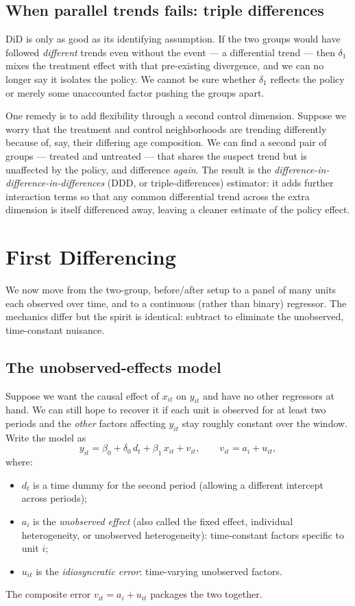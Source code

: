 \subsection{When parallel trends fails: triple differences}

DiD is only as good as its identifying assumption. If the two groups would have followed \emph{different} trends even without the event --- a differential trend --- then $\delta_1$ mixes the treatment effect with that pre-existing divergence, and we can no longer say it isolates the policy. We cannot be sure whether $\delta_1$ reflects the policy or merely some unaccounted factor pushing the groups apart.

One remedy is to add flexibility through a second control dimension. Suppose we worry that the treatment and control neighborhoods are trending differently because of, say, their differing age composition. We can find a second pair of groups --- treated and untreated --- that shares the suspect trend but is unaffected by the policy, and difference \emph{again}. The result is the \emph{difference-in-difference-in-differences} (DDD, or triple-differences) estimator: it adds further interaction terms so that any common differential trend across the extra dimension is itself differenced away, leaving a cleaner estimate of the policy effect.

\section{First Differencing}
\label{sec:fd}

We now move from the two-group, before/after setup to a panel of many units each observed over time, and to a continuous (rather than binary) regressor. The mechanics differ but the spirit is identical: subtract to eliminate the unobserved, time-constant nuisance.

\subsection{The unobserved-effects model}

Suppose we want the causal effect of $x_{it}$ on $y_{it}$ and have no other regressors at hand. We can still hope to recover it if each unit is observed for at least two periods and the \emph{other} factors affecting $y_{it}$ stay roughly constant over the window. Write the model as
\[
y_{it} = \beta_0 + \delta_0\, d_t + \beta_1\, x_{it} + v_{it},
\qquad
v_{it} = a_i + u_{it},
\]
where:
\begin{itemize}
    \item $d_t$ is a time dummy for the second period (allowing a different intercept across periods);
    \item $a_i$ is the \emph{unobserved effect} (also called the fixed effect, individual heterogeneity, or unobserved heterogeneity): time-constant factors specific to unit $i$;
    \item $u_{it}$ is the \emph{idiosyncratic error}: time-varying unobserved factors.
\end{itemize}
The composite error $v_{it}=a_i+u_{it}$ packages the two together.

